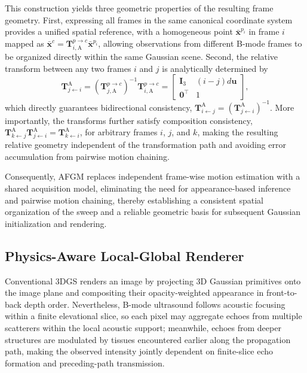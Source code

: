 This construction yields three geometric properties of the resulting frame
geometry.
First, expressing all frames in the same canonical coordinate system provides
a unified spatial reference, with a homogeneous point
$\bar{\mathbf x}^{p_i}$ in frame $i$ mapped as
$\bar{\mathbf x}^{c}
=
\mathbf T_{i,\mathrm A}^{p\rightarrow c}
\bar{\mathbf x}^{p_i}$,
allowing observations from different B-mode frames to be organized directly
within the same Gaussian scene.
Second, the relative transform between any two
frames $i$ and $j$ is analytically determined by
\begin{equation}
\mathbf T_{j\leftarrow i}^{\mathrm A}
=
\left(
\mathbf T_{j,\mathrm A}^{p\rightarrow c}
\right)^{-1}
\mathbf T_{i,\mathrm A}^{p\rightarrow c}
=
\begin{bmatrix}
\mathbf I_3 & (i-j)d\mathbf u\\
\mathbf 0^\top & 1
\end{bmatrix},
\label{eq:afgm-relative-transform}
\end{equation}
which directly guarantees bidirectional consistency,
$\mathbf T_{i\leftarrow j}^{\mathrm A}
=
(\mathbf T_{j\leftarrow i}^{\mathrm A})^{-1}$.
More importantly, the transforms further satisfy composition consistency,
$\mathbf T_{k\leftarrow j}^{\mathrm A}
\mathbf T_{j\leftarrow i}^{\mathrm A}
=
\mathbf T_{k\leftarrow i}^{\mathrm A}$,
for arbitrary frames $i$, $j$, and $k$, making the resulting relative geometry
independent of the transformation path and avoiding error accumulation from
pairwise motion chaining.

Consequently, AFGM replaces independent frame-wise motion estimation with a
shared acquisition model, eliminating the need for appearance-based inference
and pairwise motion chaining, thereby establishing a consistent spatial
organization of the sweep and a reliable geometric basis for subsequent
Gaussian initialization and rendering.

\vspace{-3mm}
\subsection{Physics-Aware Local-Global Renderer}
\label{sec:method:physics-aware-local-global-renderer}

Conventional 3DGS renders an image by projecting 3D Gaussian primitives onto
the image plane and compositing their opacity-weighted appearance in
front-to-back depth order. Nevertheless, B-mode ultrasound follows acoustic
focusing within a finite elevational slice, so each pixel may aggregate echoes
from multiple scatterers within the local acoustic support; meanwhile, echoes
from deeper structures are modulated by tissues encountered earlier along the
propagation path, making the observed intensity jointly dependent on
finite-slice echo formation and preceding-path transmission.

